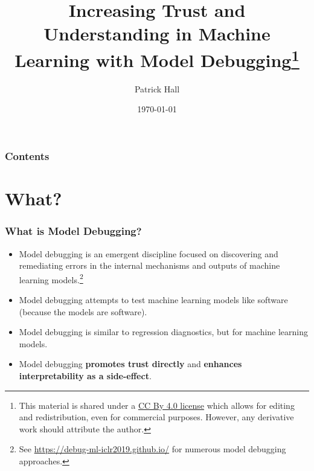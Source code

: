 \documentclass[11pt,
               aspectratio=169,
               hyperref={colorlinks}
               ]{beamer}
\author{Patrick Hall}
\title{Increasing Trust and Understanding in Machine Learning with Model Debugging\footnote{\tiny{This material is shared under a \href{https://creativecommons.org/licenses/by/4.0/deed.ast}{CC By 4.0 license} which allows for editing and redistribution, even for commercial purposes. However, any derivative work should attribute the author.}}}
\institute{\href{https://www.bnh.ai/}{bnh.ai} | \href{https://business.gwu.edu/johnston-patrick-hall}{GWSB}}
\date{\today}
\begin{document}
	
	\maketitle
	
	\begin{frame}
	
		\frametitle{Contents}
		
		\tableofcontents{}
		
	\end{frame}

	\section{What?}

	\begin{frame}
		
		\frametitle{What is Model Debugging?}
		
		\begin{itemize}
			\item Model debugging is an emergent discipline focused on discovering and remediating errors in the internal mechanisms and outputs of machine learning models.\footnote{\tiny{See \url{https://debug-ml-iclr2019.github.io/} for numerous model debugging approaches.}} 
			\item Model debugging attempts to test machine learning models like software (because the models are software).
			\item Model debugging is similar to regression diagnostics, but for machine learning models.
			\item Model debugging \textbf{promotes trust directly} and \textbf{enhances interpretability as a side-effect}.
		\end{itemize}
		
	\end{frame}
	

          
  
\end{document}
